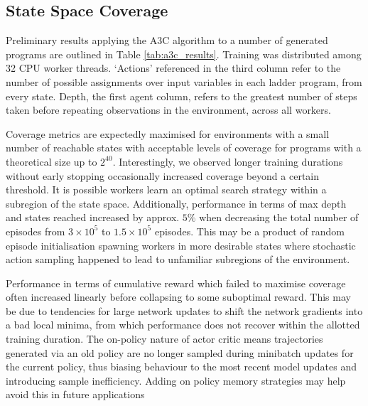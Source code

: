 \documentclass[runningheads]{llncs}
\begin{document}

\subsection{State Space Coverage}
Preliminary results applying the A3C algorithm to a number of generated programs are outlined in Table \ref{tab:a3c_results}. Training was distributed among 32 CPU worker threads. `Actions' referenced in the third column refer to the number of possible assignments over input variables in each ladder program, from every state. Depth, the first agent column, refers to the greatest number of steps taken before repeating observations in the environment, across all workers.

Coverage metrics are expectedly maximised for environments with a small number of reachable states with acceptable levels of coverage for programs with a theoretical size up to $2^{40}$. Interestingly, we observed longer training durations without early stopping occasionally increased coverage beyond a certain threshold. It is possible workers learn an optimal search strategy within a subregion of the state space. Additionally, performance in terms of max depth and states reached increased by approx. $5\%$ when decreasing the total number of episodes from $3 \times 10^{5}$ to $1.5\times10^{5}$ episodes. This may be a product of random episode initialisation spawning workers in more desirable states where stochastic action sampling happened to lead to unfamiliar subregions of the environment.

Performance in terms of cumulative reward which failed to maximise coverage often increased linearly before collapsing to some suboptimal reward. This may be due to tendencies for large network updates to shift the network gradients into a bad local minima, from which performance does not recover within the allotted training duration. The on-policy nature of actor critic means trajectories generated via an old policy are no longer sampled during minibatch updates for the current policy, thus biasing behaviour to the most recent model updates and introducing sample inefficiency. Adding on policy memory strategies\cite{wang2017sample} may help avoid this in future applications
\end{document}
